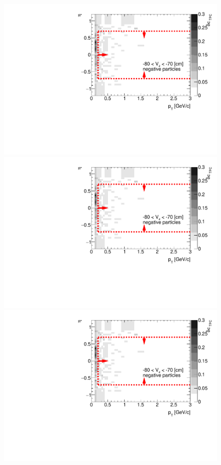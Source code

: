 \begin{figure}[H]
{	}~
	\parbox{0.325\textwidth}{
		\includegraphics[width=\linewidth,page=18]{graphics/systematicsEfficiency/deadMaterial/secondaries_Unbinned_Charged_CD.pdf}\\
		\includegraphics[width=\linewidth,page=21]{graphics/systematicsEfficiency/deadMaterial/secondaries_Unbinned_Charged_CD.pdf}\\
		\includegraphics[width=\linewidth,page=24]{graphics/systematicsEfficiency/deadMaterial/secondaries_Unbinned_Charged_CD.pdf}\\
}
\end{figure}
